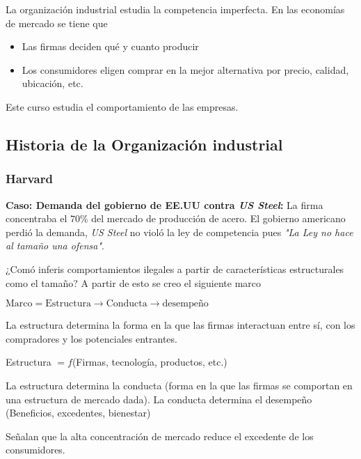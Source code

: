 \documentclass[letterpaper,12pt,twocolumn]{report}
\begin{document}
La organización industrial estudia la competencia imperfecta. En las economías de mercado se tiene que 

\begin{itemize}
    \item Las firmas deciden qué y cuanto producir
    \item Los consumidores eligen comprar en la mejor alternativa por precio, calidad, ubicación, etc.
\end{itemize}

Este curso estudia el comportamiento de las empresas.

\subsection*{Historia de la Organización industrial}

\subsubsection*{Harvard}

\textbf{Caso: Demanda del gobierno de EE.UU contra \textit{US Steel}:} La firma concentraba el $70\%$ del mercado de producción de acero. El gobierno americano perdió la demanda, \textit{US Steel} no violó la ley de competencia pues \textit{"La Ley no hace al tamaño una ofensa"}.

¿Comó inferis comportamientos ilegales a partir de características estructurales como el tamaño? A partir de esto se creo el siguiente marco

\begin{tcolorbox}[title=Definición]
$\text{Marco}=\text{Estructura}\rightarrow \text{Conducta}\rightarrow \text{desempeño}$
\end{tcolorbox}


La estructura determina la forma en la que las firmas interactuan entre sí, con los compradores y los potenciales entrantes.

\begin{tcolorbox}[title=Definición]
Estructura $ = f$(Firmas, tecnología, productos, etc.)
\end{tcolorbox}

La estructura determina la conducta (forma en la que las firmas se comportan en una estructura de mercado dada). La conducta determina el desempeño (Beneficios, excedentes, bienestar)

Señalan que la alta concentración de mercado reduce el excedente de los consumidores.
\end{document}
